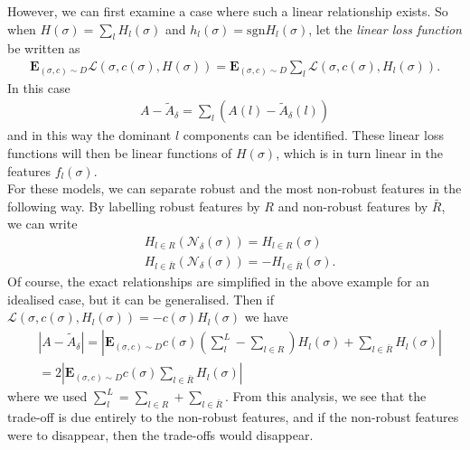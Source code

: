 \documentclass[onecolumn,prx, superscriptaddress,longbibliography,margin=1mm 11pt]{revtex4-2}
\begin{document}
     However, we can first examine a case where such a linear relationship exists. So when $H(\sigma)=\sum_l H_l(\sigma)$ and $h_l(\sigma)=\text{sgn} H_l(\sigma)$, let the \textit{linear loss function} be written as
     \begin{align}
        \textbf{E}_{(\sigma, c) \sim D} \mathcal{L}(\sigma, c(\sigma), H(\sigma))=\textbf{E}_{(\sigma,c) \sim D} \sum_{l} \mathcal{L}(\sigma, c(\sigma), H_l(\sigma)).
     \end{align}
     In this case 
     \begin{align}
         A-\tilde{A}_{\delta}=\sum_l (A(l)-\tilde{A}_{\delta}(l))
     \end{align}
     and in this way the dominant $l$ components can be identified. These linear loss functions will then be linear functions of $H(\sigma)$, which is in turn linear in the features $f_l(\sigma)$. \\
     
     For these models, we can separate robust and the most non-robust features in the following way. By labelling robust features by $R$ and non-robust features by $\bar{R}$, we can write
     \begin{align}
         &H_{l \in R} (\mathcal{N}_{\delta}(\sigma))=H_{l \in R} (\sigma) \nonumber \\
         &H_{l \in \bar{R}} (\mathcal{N}_{\delta}(\sigma))=-H_{l \in \bar{R}} (\sigma).
     \end{align}
     Of course, the exact relationships are simplified in the above example for an idealised case, but it can be generalised. Then if $\mathcal{L}(\sigma, c(\sigma), H_l(\sigma))=-c(\sigma) H_l(\sigma)$ we have 
     \begin{align}
    &|A-\tilde{A}_{\delta}|=|\textbf{E}_{(\sigma,c)\sim D} c(\sigma) (\sum_l^L-\sum_{l \in R})H_{l}(\sigma)+\sum_{l \in \bar{R}} H_l(\sigma)| \nonumber \\
    &=2|\textbf{E}_{(\sigma,c)\sim D} c(\sigma) \sum_{l \in \bar{R}} H_l(\sigma)|
     \end{align}
     where we used $\sum_l^L=\sum_{l \in R}+\sum_{l \in \bar{R}}$. From this analysis, we see that the trade-off is due entirely to the non-robust features, and if the non-robust features were to disappear, then the trade-offs would disappear. \\
     
\end{document}
